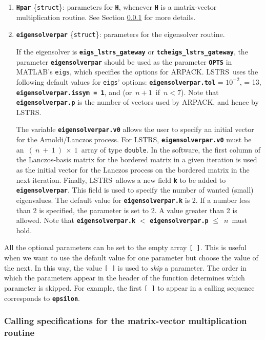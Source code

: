 \documentclass[acmtoms]{acmtrans2m}
\newcommand{\struct}{{\tt struct}}
\newcommand{\double}{{\tt double}}
\newcommand{\tenmt}{10^{\scriptscriptstyle -2}}
\newcommand{\matlab}{MATLAB}
\newcommand{\mlstrs}{LSTRS}
\begin{document}
\begin{enumerate}
\item{\tt\bf Hpar} \{\struct\}: parameters
for {\tt\bf H}, whenever {\tt\bf H} is a matrix-vector multiplication
routine. See Section \ref{mvroutine} for more details.

\item{\tt\bf eigensolverpar} {\{\tt struct}\}: parameters
for the eigensolver routine. 

If the eigensolver is {\tt\bf eigs\_lstrs\_gateway}
or {\tt\bf tcheigs\_lstrs\_gateway},
the parameter {\tt\bf eigensolverpar} should be used as the parameter
{\tt\bf OPTS} in \matlab's {\tt eigs}, which
specifies the options for ARPACK. \mlstrs\ uses the following default values for
{\tt eigs}' options: {\tt\bf eigensolverpar.tol} = $\tenmt$,  = 13,
{\tt\bf eigensolverpar.issym~=~1}, and
 (or\ $n+1$\ if\ $n<7$). 
Note that {\tt\bf eigensolverpar.p}
is the number of vectors used by ARPACK, and hence by LSTRS.

The variable {\tt\bf eigensolverpar.v0} allows the user to specify an initial
vector for the Arnoldi/Lanczos process. For \mlstrs, {\tt\bf eigensolverpar.v0}
must be an\ $(~n~+~1~)~\times~1$\ array of type \double. In the software,
the first column of the Lanczos-basis matrix for the bordered
matrix in a given iteration is used as the initial vector
for the Lanczos process on the bordered matrix in the next iteration.
Finally, \mlstrs\ allows a new field {\tt\bf k} to be added to {\tt\bf eigensolverpar}. This
field is used to specify the number of wanted (small) eigenvalues. The default value
for {\tt\bf eigensolverpar.k} is 2. If a number less than 2 is specified, the parameter is set
to 2. A value greater than 2 is allowed.
Note that {\tt\bf eigensolverpar.k} $<$ {\tt\bf eigensolverpar.p} $\leq$\ $n$\ must hold.


\end{enumerate}

All the optional parameters can be set to the empty array {\tt [ ]}. 
This is useful when we want to use the default value for one
parameter but choose the value of the next. In this way,
the value {\tt [\ ]} is used to {\em skip} a parameter.
The order in which the parameters appear in the header of the
function determines which parameter is skipped.
For example, the first {\tt [\ ]} to appear in a calling sequence corresponds
to {\tt\bf epsilon}.


\subsubsection{Calling specifications for the matrix-vector multiplication routine}\label{mvroutine}
\end{document}
